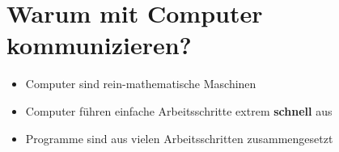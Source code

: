 
\section{Warum mit Computer kommunizieren?}
\begin{frame}
    \slidehead
    \vspace{3mm}
    \begin{itemize}
        \pause
        \item Computer sind rein-mathematische Maschinen
            \pause
        \item Computer führen einfache Arbeitsschritte extrem \textbf{schnell} aus
            \pause
        \item Programme sind aus vielen Arbeitsschritten zusammengesetzt
            \pause
    \end{itemize}
\end{frame}

